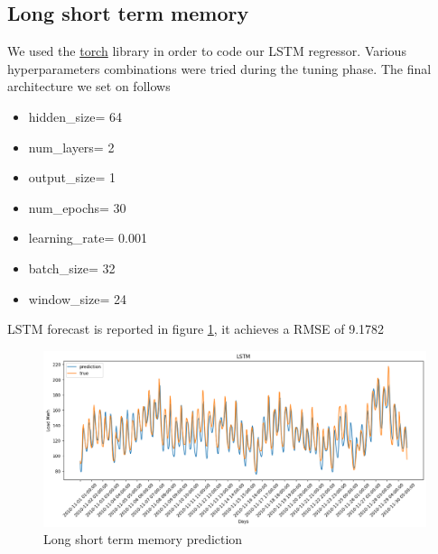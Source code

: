 \subsection{Long short term memory}
We used the \href{https://pytorch.org}{torch} library in order to code our LSTM regressor.
Various hyperparameters combinations were tried during the tuning phase. The final architecture we set on follows
\begin{itemize}
    \item hidden\_size= 64
    \item num\_layers= 2
    \item output\_size= 1
    \item num\_epochs= 30
    \item learning\_rate= 0.001
    \item batch\_size= 32
    \item window\_size= 24
\end{itemize}
LSTM forecast is reported in figure \ref{fig:lstm_price}, it achieves a RMSE of 9.1782
\begin{figure}[!h]
    \includegraphics[width=\textwidth]{images/lstm_price.png}
    \caption{Long short term memory prediction}
    \label{fig:lstm_price}
\end{figure}

